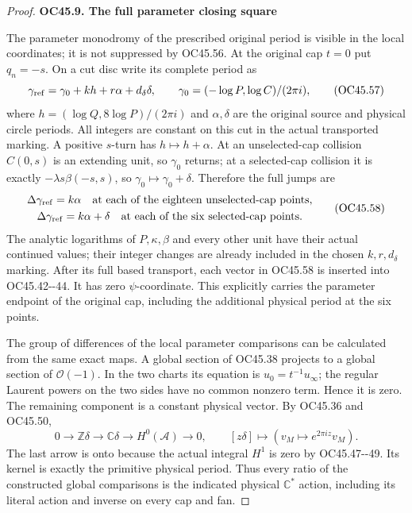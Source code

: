 \begin{proof}
\par

\medskip\noindent\textbf{OC45.9. The full parameter closing square}

\par\nobreak

The parameter monodromy of the prescribed original period is
visible in the local coordinates; it is not suppressed by
OC45.56. At the original cap \(t=0\) put \(q_n=-s\). On a cut
disc write its complete period as
\[
 \gamma_{\rm ref}=\gamma_0+k h+r\alpha+d_\delta\delta,
 \qquad \gamma_0=(-\log P,\log C)/(2\pi i),
 \tag{OC45.57}
\]
where \(h=(\log Q,8\log P)/(2\pi i)\) and \(\alpha,\delta\)
are the original source and physical circle periods.
All integers are constant on this cut in the actual transported
marking. A positive \(s\)-turn has \(h\mapsto h+\alpha\).
At an unselected-cap collision \(C(0,s)\) is an extending unit,
so \(\gamma_0\) returns; at a selected-cap collision it is
exactly \(-\lambda s\beta(-s,s)\), so
\(\gamma_0\mapsto\gamma_0+\delta\). Therefore the full jumps are
\[
\begin{gathered}
 \Delta\gamma_{\rm ref}=k\alpha
       \quad\hbox{at each of the eighteen unselected-cap points},\\
 \Delta\gamma_{\rm ref}=k\alpha+\delta
       \quad\hbox{at each of the six selected-cap points}.
\end{gathered}
 \tag{OC45.58}
\]
The analytic logarithms of \(P,\kappa,\beta\) and every other unit
have their actual continued values; their integer changes are
already included in the chosen \(k,r,d_\delta\) marking.
After its full based transport, each vector in OC45.58 is
inserted into OC45.42-\/-44. It has zero \(\psi\)-coordinate.
This explicitly carries the parameter endpoint of the original
cap, including the additional physical period at the six points.

The group of differences of the local parameter comparisons
can be calculated from the same exact maps. A global section
of OC45.38 projects to a global section of \(\mathcal O(-1)\).
In the two charts its equation is \(u_0=t^{-1}u_\infty\);
the regular Laurent powers on the two sides have no common
nonzero term. Hence it is zero. The remaining component is a
constant physical vector. By OC45.36 and OC45.50,
\[
 0\longrightarrow\mathbb Z\delta\longrightarrow\mathbb C\delta
 \longrightarrow H^0(\mathscr A)\longrightarrow0,\qquad
 [z\delta]\longmapsto(v_M\mapsto e^{2\pi iz}v_M).
 \tag{OC45.59}
\]
The last arrow is onto because the actual integral \(H^1\)
is zero by OC45.47-\/-49. Its kernel is exactly the primitive
physical period. Thus every ratio of the constructed global
comparisons is the indicated physical \(\mathbb C^*\) action,
including its literal action and inverse on every cap and fan.


\end{proof}
